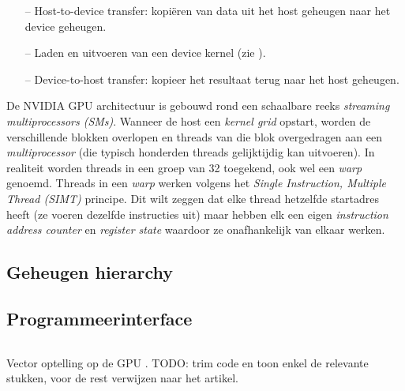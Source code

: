 \begin{itemize}
	\item[--] Host-to-device transfer: kopiëren van data uit het host geheugen naar het device geheugen.
	\item[--] Laden en uitvoeren van een device kernel (zie ).
	\item[--] Device-to-host transfer: kopieer het resultaat terug naar het host geheugen.
\end{itemize}



De NVIDIA GPU architectuur is gebouwd rond een schaalbare reeks \textit{streaming multiprocessors (SMs)}. Wanneer de host een \textit{kernel grid} opstart, worden de verschillende blokken overlopen en threads van die blok overgedragen aan een \textit{multiprocessor} (die typisch honderden threads gelijktijdig kan uitvoeren). In realiteit worden threads in een groep van 32 toegekend, ook wel een \textit{warp} genoemd. Threads in een \textit{warp} werken volgens het \textit{Single Instruction, Multiple Thread (SIMT)} principe. Dit wilt zeggen dat elke thread hetzelfde startadres heeft (ze voeren dezelfde instructies uit) maar hebben elk een eigen \textit{instruction address counter} en \textit{register state} waardoor ze onafhankelijk van elkaar werken.

\subsection{Geheugen hierarchy}

\subsection{Programmeerinterface}
\label{subsec:programminginterface}


\begin{code}
	\inputminted{c++}{codelistings/vecadd.cu}
	\caption{Vector optelling op de GPU \cite{Harris2017}. TODO: trim code en toon enkel de relevante stukken, voor de rest verwijzen naar het artikel.}
\end{code}

